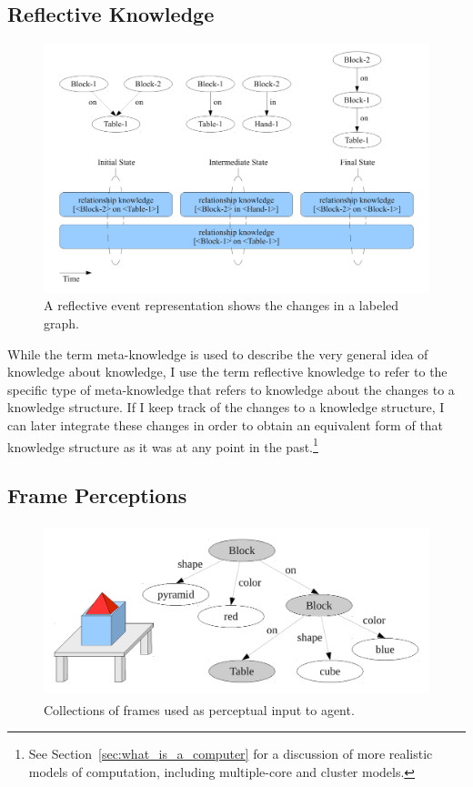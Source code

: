 \subsection{Reflective Knowledge}

\begin{figure}[bth]
  \center
  \includegraphics[width=12cm]{gfx/reflective_event_representation}
  \caption[A reflective event representation]{A reflective event representation shows the changes in a labeled graph.}
  \label{fig:reflective_event_representation}
\end{figure}


While the term meta-knowledge is used to describe the very general
idea of knowledge about knowledge, I use the term reflective knowledge
to refer to the specific type of meta-knowledge that refers to
knowledge about the changes to a knowledge structure.  If I keep track
of the changes to a knowledge structure, I can later integrate these
changes in order to obtain an equivalent form of that knowledge
structure as it was at any point in the past.\footnote{See
  Section~\ref{sec:what_is_a_computer} for a discussion of more
  realistic models of computation, including multiple-core and cluster
  models.}


\subsection{Frame Perceptions}

\begin{figure}[bth]
  \center
  \includegraphics[height=5cm]{gfx/frame_perception}
  \caption[Collections of frames used as perceptual input to agent]{Collections of frames used as perceptual input to agent.}
  \label{fig:frame_perception}
\end{figure}

